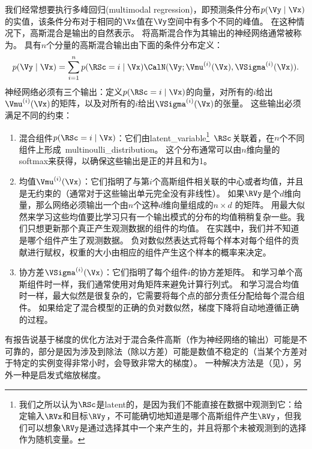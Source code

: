 
我们经常想要执行多峰回归(multimodal regression)，即预测条件分布$p(\Vy\mid\Vx)$的实值，该条件分布对于相同的$\Vx$值在$\Vy$空间中有多个不同的峰值。
在这种情况下，高斯混合是输出的自然表示\citep{Jacobs-et-al-1991,Bishop-1994}。
将高斯混合作为其输出的神经网络通常被称为。
具有$n$个分量的高斯混合输出由下面的条件分布定义：
\begin{equation}
p(\Vy\mid\Vx) = \sum_{i=1}^n p(\RSc = i \mid \Vx) \CalN(\Vy; \Vmu^{(i)}(\Vx), \VSigma^{(i)}(\Vx)).
\end{equation}
神经网络必须有三个输出：定义$p(\RSc=i\mid\Vx)$的向量，对所有的$i$给出$\Vmu^{(i)}(\Vx)$的矩阵，以及对所有的$i$给出$\VSigma^{(i)}(\Vx)$的张量。
这些输出必须满足不同的约束：
\begin{enumerate}
\item 混合组件$p(\RSc=i\mid\Vx)$：它们由\gls{latent_variable}\footnote{我们之所以认为$\RSc$是\gls{latent}的，是因为我们不能直接在数据中观测到它：给定输入$\RVx$和目标$\RVy$，不可能确切地知道是哪个高斯组件产生$\RVy$，但我们可以想象$\RVy$是通过选择其中一个来产生的，并且将那个未被观测到的选择作为随机变量。}~$\RSc$关联着，在$n$个不同组件上形成~\gls{multinoulli_distribution}。
这个分布通常可以由$n$维向量的softmax来获得，以确保这些输出是正的并且和为1。

\item 均值$\Vmu^{(i)}(\Vx)$：它们指明了与第$i$个高斯组件相关联的中心或者均值，并且是无约束的（通常对于这些输出单元完全没有非线性）。
如果$\RVy$是个$d$维向量，那么网络必须输出一个由$n$个这种$d$维向量组成的$n\times d$ 的矩阵。
用最大似然来学习这些均值要比学习只有一个输出模式的分布的均值稍稍复杂一些。我们只想更新那个真正产生观测数据的组件的均值。
在实践中，我们并不知道是哪个组件产生了观测数据。
负对数似然表达式将每个样本对每个组件的贡献进行赋权，权重的大小由相应的组件产生这个样本的概率来决定。

\item 协方差$\VSigma^{(i)}(\Vx)$：它们指明了每个组件$i$的协方差矩阵。
和学习单个高斯组件时一样，我们通常使用对角矩阵来避免计算行列式。
和学习混合均值时一样，最大似然是很复杂的，它需要将每个点的部分责任分配给每个混合组件。
如果给定了混合模型的正确的负对数似然，梯度下降将自动地遵循正确的过程。
\end{enumerate}
有报告说基于梯度的优化方法对于混合条件高斯（作为神经网络的输出）可能是不可靠的，部分是因为涉及到除法（除以方差）可能是数值不稳定的（当某个方差对于特定的实例变得非常小时，会导致非常大的梯度）。
一种解决方法是（见），另外一种是启发式缩放梯度\citep{Murray-Larochelle-2014}。

